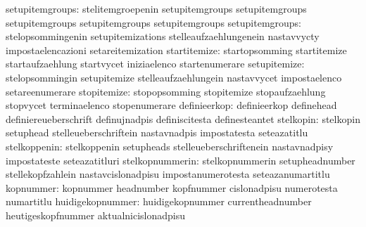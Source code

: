                  setupitemgroups: stelitemgroepenin                setupitemgroups
                                  setupitemgroups                  setupitemgroups
                                  setupitemgroups                  setupitemgroups
                 setupitemgroups: stelopsommingenin                setupitemizations
                                  stelleaufzaehlungenein           nastavvycty
                                  impostaelencazioni               setareitemization
                    startitemize: startopsomming                   startitemize
                                  startaufzaehlung                 startvycet
                                  iniziaelenco                     startenumerare
                    setupitemize: stelopsommingin                  setupitemize
                                  stelleaufzaehlungein             nastavvycet
                                  impostaelenco                    setareenumerare
                     stopitemize: stopopsomming                    stopitemize
                                  stopaufzaehlung                  stopvycet
                                  terminaelenco                    stopenumerare
%
                    definieerkop: definieerkop                     definehead
                                  definiereueberschrift            definujnadpis
                                  definiscitesta                   definesteantet
                       stelkopin: stelkopin                        setuphead
                                  stelleueberschriftein            nastavnadpis
                                  impostatesta                     seteazatitlu
                    stelkoppenin: stelkoppenin                     setupheads
                                  stelleueberschriftenein          nastavnadpisy
                                  impostateste                     seteazatitluri
                 stelkopnummerin: stelkopnummerin                  setupheadnumber
                                  stellekopfzahlein                nastavcislonadpisu
                                  impostanumerotesta               seteazanumartitlu
                       kopnummer: kopnummer                        headnumber
                                  kopfnummer                       cislonadpisu
                                  numerotesta                      numartitlu
                huidigekopnummer: huidigekopnummer                 currentheadnumber
                                  heutigeskopfnummer               aktualnicislonadpisu

